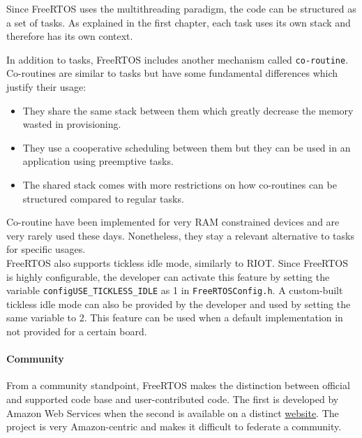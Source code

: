 Since FreeRTOS uses the multithreading paradigm, the code can be structured as a set of tasks.
As explained in the first chapter, each task uses its own stack and therefore has its own context.

In addition to tasks, FreeRTOS includes another mechanism called \texttt{co-routine}\cite{freertos-tasks-coroutines, freertos-tasks-coroutines2}.
Co-routines are similar to tasks but have some fundamental differences which justify their usage:
\begin{itemize}
    \item They share the same stack between them which greatly decrease the memory wasted in provisioning.
    \item They use a cooperative scheduling between them but they can be used in an application using preemptive tasks.
    \item The shared stack comes with more restrictions on how co-routines can be structured compared to regular tasks.
\end{itemize}
Co-routine have been implemented for very RAM constrained devices and are very rarely used these days.
Nonetheless, they stay a relevant alternative to tasks for specific usages.\\
FreeRTOS also supports tickless idle mode, similarly to RIOT.
Since FreeRTOS is highly configurable, the developer can activate this feature 
    by setting the variable \texttt{configUSE\_TICKLESS\_IDLE} as 1 in \texttt{FreeRTOSConfig.h}.
A custom-built tickless idle mode can also be provided by the developer and used by setting the same variable to 2.
This feature can be used when a default implementation in not provided for a certain board.

\paragraph{Community} From a community standpoint, FreeRTOS makes the distinction between official and supported code base and user-contributed code.
The first is developed by Amazon Web Services when the second is available on a distinct \href{https://interactive.freertos.org/hc/en-us}{website}.%
The project is very Amazon-centric and makes it difficult to federate a community.